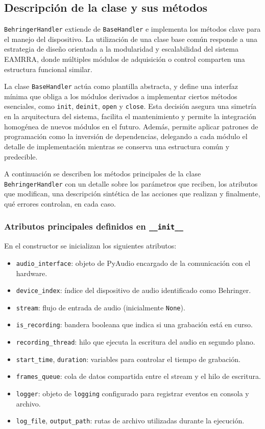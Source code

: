 \subsection{Descripción de la clase y sus métodos}

\texttt{BehringerHandler} extiende de \texttt{BaseHandler} e implementa los métodos clave para el manejo del dispositivo. La utilización de una clase base común responde a una estrategia de diseño orientada a la modularidad y escalabilidad del sistema EAMRRA, donde múltiples módulos de adquisición o control comparten una estructura funcional similar. 

La clase \texttt{BaseHandler} actúa como plantilla abstracta, y define una interfaz mínima que obliga a los módulos derivados a implementar ciertos métodos esenciales, como \texttt{init}, \texttt{deinit}, \texttt{open} y \texttt{close}. Esta decisión asegura una simetría en la arquitectura del sistema, facilita el mantenimiento y permite la integración homogénea de nuevos módulos en el futuro. Además, permite aplicar patrones de programación como la inversión de dependencias, delegando a cada módulo el detalle de implementación mientras se conserva una estructura común y predecible.

A continuación se describen los métodos principales de la clase \texttt{BehringerHandler} con un detalle sobre los parámetros que reciben, los atributos que modifican, una descripción sintética de las acciones que realizan y finalmente, qué errores controlan, en cada caso.

\subsubsection*{Atributos principales definidos en \texttt{\_\_init\_\_}}

En el constructor se inicializan los siguientes atributos:

\begin{itemize}
    \item \texttt{audio\_interface}: objeto de PyAudio encargado de la comunicación con el hardware.
    \item \texttt{device\_index}: índice del dispositivo de audio identificado como Behringer.
    \item \texttt{stream}: flujo de entrada de audio (inicialmente \texttt{None}).
    \item \texttt{is\_recording}: bandera booleana que indica si una grabación está en curso.
    \item \texttt{recording\_thread}: hilo que ejecuta la escritura del audio en segundo plano.
    \item \texttt{start\_time}, \texttt{duration}: variables para controlar el tiempo de grabación.
    \item \texttt{frames\_queue}: cola de datos compartida entre el stream y el hilo de escritura.
    \item \texttt{logger}: objeto de \texttt{logging} configurado para registrar eventos en consola y archivo.
    \item \texttt{log\_file}, \texttt{output\_path}: rutas de archivo utilizadas durante la ejecución.
\end{itemize}

